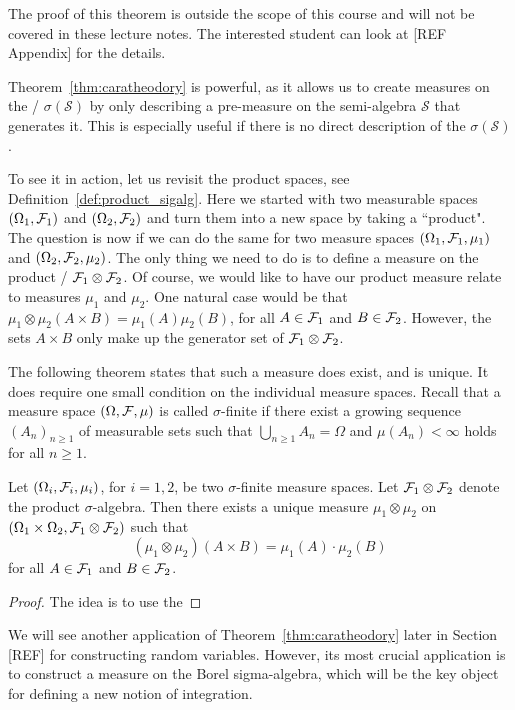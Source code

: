 The proof of this theorem is outside the scope of this course and will not be covered in these lecture notes. The interested student can look at [REF Appendix] for the details.

Theorem~\ref{thm:caratheodory} is powerful, as it allows us to create measures on the \sigalg/ $\sigma(\mathcal{S})$ by only describing a pre-measure on the semi-algebra $\mathcal{S}$ that generates it. This is especially useful if there is no direct description of the $\sigma(\mathcal{S})$. 

To see it in action, let us revisit the product spaces, see Definition~\ref{def:product_sigalg}. Here we started with two measurable spaces $(\Omega_1, \mathcal F_1)$ and $(\Omega_2, \mathcal F_2)$ and turn them into a new space by taking a ``product". The question is now if we can do the same for two measure spaces $(\Omega_1, \mathcal F_1, \mu_1)$ and $(\Omega_2, \mathcal F_2, \mu_2)$. The only thing we need to do is to define a measure on the product \sigalg/ $\mathcal F_1 \otimes \mathcal F_2$. Of course, we would like to have our product measure relate to measures $\mu_1$ and $\mu_2$. One natural case would be that $\mu_1 \otimes \mu_2 (A \times B) =\mu_1(A) \mu_2(B)$, for all $A \in \mathcal F_1$ and $B \in \mathcal F_2$. However, the sets $A \times B$ only make up the generator set of $\mathcal F_1 \otimes \mathcal F_2$. 

The following theorem states that such a measure does exist, and is unique. It does require one small condition on the individual measure spaces. Recall that a measure space $(\Omega, \mathcal F, \mu)$ is called $\sigma$-finite if there exist a growing sequence $(A_n)_{n \ge 1}$ of measurable sets such that $\bigcup_{n \ge 1} A_n = \Omega$ and $\mu(A_n) < \infty$ holds for all $n \ge 1$. 

\begin{theorem}\label{th:construction-product-measure}
Let $(\Omega_i, \mathcal F_i, \mu_i)$, for $i = 1, 2$,  be two $\sigma$-finite measure spaces. Let $\mathcal F_1 \otimes \mathcal F_2$ denote the product $\sigma$-algebra. Then there exists a unique measure $\mu_1 \otimes \mu_2$ on $(\Omega_1 \times \Omega_2, \mathcal F_1 \otimes \mathcal F_2)$ such that 
\[
	(\mu_1 \otimes \mu_2)(A \times B ) = \mu_1(A) \cdot \mu_2(B)
\]
for all $A \in \mathcal F_1$ and $B \in \mathcal F_2$.
\end{theorem}

\begin{proof}
The idea is to use the
\end{proof}

We will see another application of Theorem~\ref{thm:caratheodory} later in Section [REF] for constructing random variables. However, its most crucial application is to construct a measure on the Borel sigma-algebra, which will be the key object for defining a new notion of integration.

